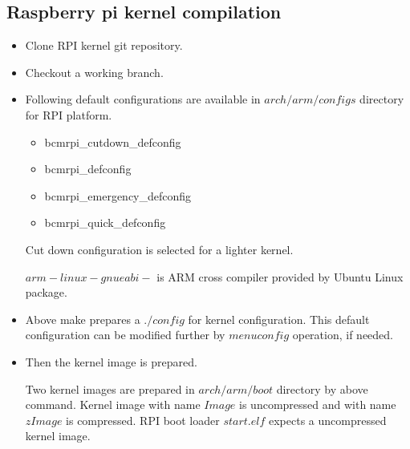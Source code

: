 \subsection {Raspberry pi kernel compilation}
\begin{itemize}
	\item Clone RPI kernel git repository.\\
		 \par
	\item Checkout a working branch.\\
		 \par
	\item Following default configurations are available in
		$arch/arm/configs$ directory for RPI platform. 
		\begin{itemize}
			\item bcmrpi\_cutdown\_defconfig
			\item bcmrpi\_defconfig
			\item bcmrpi\_emergency\_defconfig
			\item bcmrpi\_quick\_defconfig
		\end{itemize}
		Cut down configuration is selected for a lighter kernel.\\
		 \par
		$arm-linux-gnueabi-$ is ARM cross compiler provided by Ubuntu Linux package.  
	\item Above make prepares a $./config$ for kernel configuration.
		This default configuration can be modified further by
		$menuconfig$ operation, if needed.
		 \par
	\item Then the kernel image is prepared.
		 \par
		Two kernel images are prepared in $arch/arm/boot$ directory by
		above command. Kernel image with name $Image$ is
		uncompressed and with name $zImage$ is compressed. RPI
		boot loader $start.elf$ expects a uncompressed kernel
		image.
\end{itemize}
